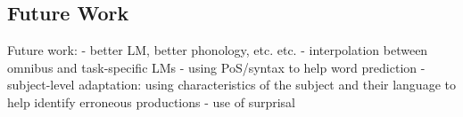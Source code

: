 \subsection{Future Work} %
\label{sub:future_work}

Future work:
    - better LM, better phonology, etc. etc.
        - interpolation between omnibus and task-specific LMs
    - using PoS/syntax to help word prediction
    - subject-level adaptation: using characteristics of the subject and their language to help identify erroneous productions
    - use of surprisal



%





